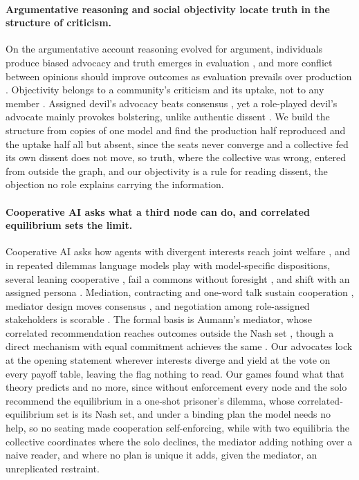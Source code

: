 \paragraph{Argumentative reasoning and social objectivity locate truth in the structure of criticism.}
On the argumentative account reasoning evolved for argument, individuals
produce biased advocacy and truth emerges in evaluation
\citep{mercier2011argumentative,mercier2017enigma,trouche2014arguments,trouche2016selective},
and more conflict between opinions should improve outcomes as evaluation
prevails over production \citep{mercier2016predictions}. Objectivity belongs
to a community's criticism and its uptake, not to any member
\citep{longino1990science,longino2002fate,popper2011open}. Assigned devil's
advocacy beats consensus \citep{schweiger1986group,schwenk1990effects}, yet a
role-played devil's advocate mainly provokes bolstering, unlike authentic
dissent \citep{nemeth2001devil}. We build the structure from copies of one
model and find the production half reproduced and the uptake half all but
absent, since the seats never converge and a collective fed its own dissent
does not move, so truth, where the collective was wrong, entered from outside
the graph, and our objectivity is a rule for reading dissent, the objection no
role explains carrying the information.

\paragraph{Cooperative AI asks what a third node can do, and correlated equilibrium sets the limit.}
Cooperative AI asks how agents with divergent interests reach joint welfare
\citep{dafoe2020cooperative}, and in repeated dilemmas language models play
with model-specific dispositions, several leaning cooperative
\citep{akata2025repeated,fontana2025nicer,willis2025cooperate,zheng2025bounded},
fail a commons without foresight \citep{piatti2024cooperate}, and shift with
an assigned persona \citep{leon2026personas,jia2025strategic}. Mediation,
contracting and one-word talk sustain cooperation
\citep{tewolde2026coopeval,wyse2026contracts,madmoun2026communication},
mediator design moves consensus \citep{liu2026promediate}, and negotiation
among role-assigned stakeholders is scorable \citep{abdelnabi2024negotiation}.
The formal basis is Aumann's mediator, whose correlated recommendation reaches
outcomes outside the Nash set \citep{aumann1974subjectivity}, though a direct
mechanism with equal commitment achieves the same
\citep{myerson1986multistage}. Our advocates lock at the opening statement
wherever interests diverge and yield at the vote on every payoff table,
leaving the flag nothing to read. Our games found what that theory predicts
and no more, since without enforcement every node and the solo recommend the
equilibrium in a one-shot prisoner's dilemma, whose correlated-equilibrium set
is its Nash set, and under a binding plan the model needs no help, so no
seating made cooperation self-enforcing, while with two equilibria the
collective coordinates where the solo declines, the mediator adding nothing
over a naive reader, and where no plan is unique it adds, given the mediator,
an unreplicated restraint.
